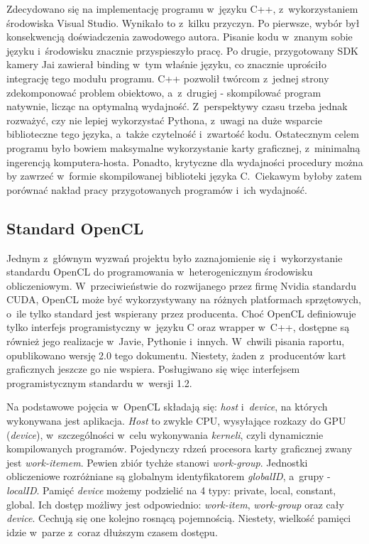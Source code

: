 Zdecydowano się na implementację programu w~języku C++, z~wykorzystaniem środowiska Visual Studio. Wynikało to z~kilku przyczyn. Po pierwsze, wybór był konsekwencją doświadczenia zawodowego autora. Pisanie kodu w~znanym sobie języku i~środowisku znacznie przyspieszyło pracę. Po drugie, przygotowany SDK kamery Jai zawierał binding w~tym właśnie języku, co znacznie uprościło integrację tego modułu programu. C++ pozwolił twórcom z~jednej strony zdekomponować problem obiektowo, a~z~drugiej - skompilować program natywnie, licząc na optymalną wydajność. Z~perspektywy czasu trzeba jednak rozważyć, czy nie lepiej wykorzystać Pythona, z~uwagi na duże wsparcie biblioteczne tego języka, a~także czytelność i~zwartość kodu. Ostatecznym celem programu było bowiem maksymalne wykorzystanie karty graficznej, z~minimalną ingerencją komputera-hosta. Ponadto, krytyczne dla wydajności procedury można by zawrzeć w~formie skompilowanej biblioteki języka C.~Ciekawym byłoby zatem porównać nakład pracy przygotowanych programów i~ich wydajność.

\subsection{Standard OpenCL}
Jednym z~głównym wyzwań projektu było zaznajomienie się i~wykorzystanie standardu OpenCL \cite{OpenCL} do programowania w~heterogenicznym środowisku obliczeniowym. W~przeciwieństwie do rozwijanego przez firmę Nvidia standardu CUDA, OpenCL może być wykorzystywany na różnych platformach sprzętowych, o~ile tylko standard jest wspierany przez producenta. Choć OpenCL definiowuje tylko interfejs programistyczny w~języku C oraz wrapper w~C++, dostępne są również jego realizacje w~Javie, Pythonie i~innych. W~chwili pisania raportu, opublikowano wersję 2.0 tego dokumentu. Niestety, żaden z~producentów kart graficznych jeszcze go nie wspiera. Posługiwano się więc interfejsem programistycznym standardu w~wersji 1.2.

Na podstawowe pojęcia w~OpenCL składają się: \textit{host} i~\textit{device}, na których wykonywana jest aplikacja. \textit{Host} to zwykle CPU, wysyłające rozkazy do GPU (\textit{device}), w~szczególności w~celu wykonywania \textit{kerneli}, czyli dynamicznie kompilowanych programów. Pojedynczy rdzeń procesora karty graficznej zwany jest \textit{work-itemem}. Pewien zbiór tychże stanowi \textit{work-group}. Jednostki obliczeniowe rozróżniane są globalnym identyfikatorem \textit{globalID}, a~grupy - \textit{localID}. 
Pamięć \textit{device} możemy podzielić na 4 typy: private, local, constant, global. Ich dostęp możliwy jest odpowiednio: \textit{work-item}, \textit{work-group} oraz cały \textit{device}. Cechują się one kolejno rosnącą pojemnością. Niestety, wielkość pamięci idzie w~parze z~coraz dłuższym czasem dostępu.

